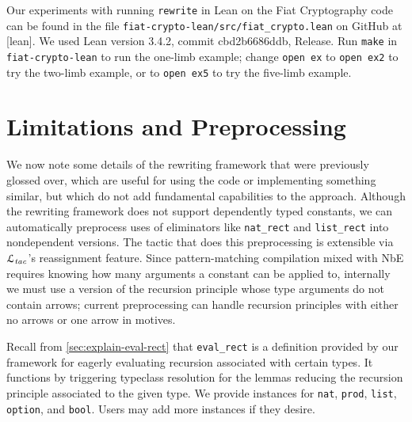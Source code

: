 \documentclass[a4paper,USenglish,cleveref,autoref,thm-restate]{lipics-v2021}
\newcommand{\todo}[1]{\textcolor{red}{\textbf{TODO: #1}}}
\newcommand{\Ltac}{\ensuremath{\mathcal{L}_\text{\emph{tac}}}}
\begin{document}
Our experiments with running \texttt{rewrite} in Lean on the Fiat Cryptography code can be found in the file \texttt{fiat-crypto-lean/src/fiat\_crypto.lean} on GitHub at [lean].
We used Lean version 3.4.2, commit cbd2b6686ddb, Release.
Run \texttt{make} in \texttt{fiat-crypto-lean} to run the one-limb example;
change \texttt{open ex} to \texttt{open ex2} to try the two-limb example, or to \texttt{open ex5} to try the five-limb example.

\section{Limitations and Preprocessing}\label{sec:implementation-and-usage}


We now note some details of the rewriting framework that were previously glossed over, which are useful for using the code or implementing something similar, but which do not add fundamental capabilities to the approach.
Although the rewriting framework does not support dependently typed constants, we can automatically preprocess uses of eliminators like \texttt{nat_rect} and \texttt{list_rect} into nondependent versions.
The tactic that does this preprocessing is extensible via \Ltac{}'s reassignment feature.
Since pattern-matching compilation mixed with NbE requires knowing how many arguments a constant can be applied to, internally we must use a version of the recursion principle whose type arguments do not contain arrows; current preprocessing can handle recursion principles with either no arrows or one arrow in motives.

Recall from \autoref{sec:explain-eval-rect} that \texttt{eval_rect} is a definition provided by our framework for eagerly evaluating recursion associated with certain types.
It functions by triggering typeclass resolution for the lemmas reducing the recursion principle associated to the given type.
We provide instances for \texttt{nat}, \texttt{prod}, \texttt{list}, \texttt{option}, and \texttt{bool}.
Users may add more instances if they desire.
\end{document}
